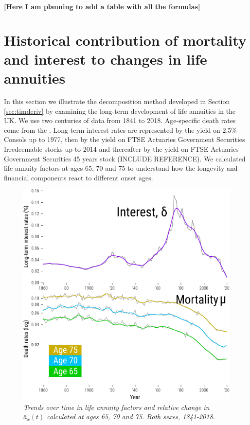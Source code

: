 \documentclass[12pt]{article}
\begin{document}
\textbf{[Here I am planning to add a table with all the formulas]}

\section{Historical contribution of mortality and interest to changes in life annuities}



In this section we illustrate the decomposition method developed in Section \ref{sec:timderiv} by examining the long-term development of life annuities in the UK. We use two centuries of data from 1841 to 2018. Age-specific death rates come from the \citep{HMD2020}. Long-term interest rates are represented by the yield on 2.5\% Consols up to 1977, then by the yield on FTSE Actuaries Government Securities Irredeemable stocks up to 2014 and thereafter by the yield on FTSE Actuaries Government Securities 45 years stock (INCLUDE REFERENCE). We calculated life annuity factors at ages 65, 70 and 75 to understand how the longevity and financial components react to different onset ages.

\begin{figure}[!ht]
	\centering
	\includegraphics[width=1\textwidth]{Fig/Fig1}
	\caption{\textit{Trends over time in life annuity factors and relative change in $\bar{a}_x(t)$ calculated at ages 65, 70 and 75. Both sexes, 1841-2018.}}
	\label{fig:Fig1}
\end{figure}
\end{document}
